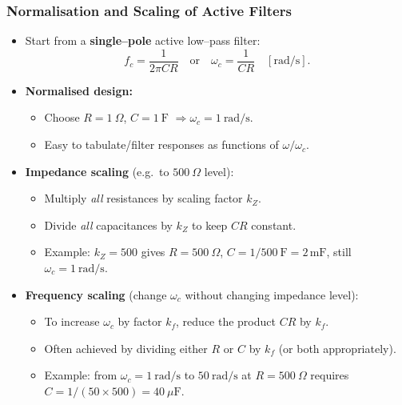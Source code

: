 \begin{frame}
	\frametitle{Normalisation and Scaling of Active Filters}
	\begin{itemize}
	\item Start from a \textbf{single–pole} active low–pass filter:
		\begin{equation}
		f_c = \frac{1}{2\pi C R} \quad \text{or} \quad
		\omega_c = \frac{1}{C R} \quad [\text{rad/s}].
		\end{equation}
	\item \textbf{Normalised design:}
		\begin{itemize}
		\item Choose $R = 1~\Omega$, $C = 1~\text{F}$ 
				$\Rightarrow \omega_c = 1~\text{rad/s}$.
		\item Easy to tabulate/filter responses as functions of 
				$\omega/\omega_c$.
		\end{itemize}
	\item \textbf{Impedance scaling} (e.g.\ to $500~\Omega$ level):
		\begin{itemize}
		\item Multiply \emph{all} resistances by scaling factor $k_Z$.
		\item Divide \emph{all} capacitances by $k_Z$ to keep $CR$ constant.
		\item Example: $k_Z=500$ gives $R=500~\Omega$, 
				$C = 1/500~\text{F} = 2\,\text{mF}$, still $\omega_c=1~\text{rad/s}$.
		\end{itemize}
	\item \textbf{Frequency scaling} (change $\omega_c$ without changing impedance level):
		\begin{itemize}
		\item To increase $\omega_c$ by factor $k_f$, reduce the product
				$CR$ by $k_f$.
		\item Often achieved by dividing either $R$ or $C$ by $k_f$
				(or both appropriately).
		\item Example: from $\omega_c=1~\text{rad/s}$ to $50~\text{rad/s}$ at
				$R=500~\Omega$ requires $C = 1/(50\times 500) = 40~\mu\text{F}$.
		\end{itemize}
	\end{itemize}
\end{frame}

